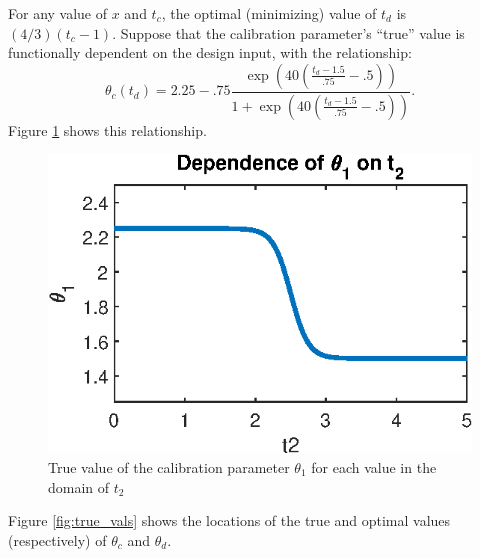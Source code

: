 \documentclass[twocolumn,10pt]{asme2ej}
\begin{document}
%
For any value of $x$ and $t_c$, the optimal (minimizing) value of $t_d$ is $(4/3)(t_c-1)$.
%
Suppose that the calibration parameter's ``true'' value is functionally dependent on the design input, with the relationship:
%
\[\theta_c(t_d)= 2.25 - .75 \frac{ \exp\left(40\left(\frac{t_d-1.5}{.75}-.5\right)\right)} {1 + \exp\left( 40\left(\frac{t_d-1.5}{.75}-.5\right) \right)}.\]
%
Figure \ref{fig:SA_relationship} shows this relationship.
%
\begin{figure}
	\centering
	\includegraphics[scale=0.85]{FIG_theta_1_dependence_on_t2}
	\captionsetup{width=.85\linewidth}
	\caption{True value of the calibration parameter $\theta_1$ for each value in the domain of $t_2$}
	\label{fig:SA_relationship}
\end{figure}
%
Figure \ref{fig:true_vals} shows the locations of the true and optimal values (respectively) of $\theta_c$ and $\theta_d$.
%
\end{document}
